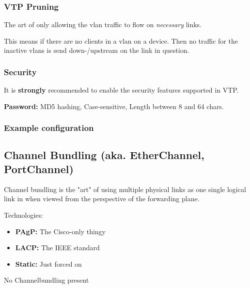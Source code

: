 \subsubsection{VTP Pruning}
The art of only allowing the vlan traffic to flow on \textit{necessary} links.

This means if there are no clients in a vlan on a device. Then no traffic for the inactive vlans is send down-/upstream on the link in question.

\subsubsection{Security}
It is \textbf{strongly} recommended to enable the security features supported in VTP.

\textbf{Password:} MD5 hashing, Case-sensitive, Length between 8 and 64 chars.


\subsubsection{Example configuration}


\subsection{Channel Bundling (aka. EtherChannel, PortChannel)}
Channel bundling is the "art" of using multiple physical links as one single logical link in when viewed from the perspective of the forwarding plane.

Technologies:
\begin{itemize}
    \item \textbf{PAgP:} The Cisco-only thingy
    \item \textbf{LACP:} The IEEE standard
    \item \textbf{Static:} Just forced on
\end{itemize}

%
{No Channelbundling present}

